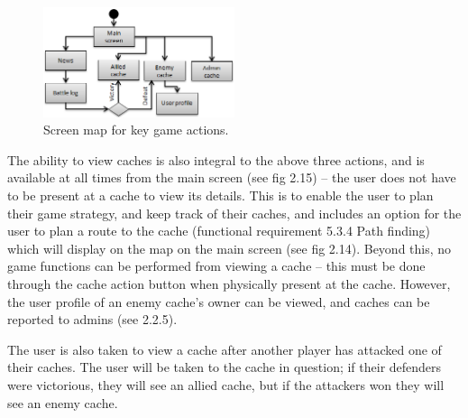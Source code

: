 \begin{figure}
	\vspace{-20pt}
	\begin{center}
	\includegraphics[width=0.5\textwidth]{images/viewing_caches}
	\caption{Screen map for key game actions.}
	\end{center}
	\vspace{-20pt}
\end{figure}
The ability to view caches is also integral to the above three actions, and is available at all times from the main screen (see fig 2.15) – the user does not have to be present at a cache to view its details. This is to enable the user to plan their game strategy, and keep track of their caches, and includes an option for the user to plan a route to the cache (functional requirement 5.3.4 Path finding) which will display on the map on the main screen (see fig 2.14). Beyond this, no game functions can be performed from viewing a cache – this must be done through the cache action button when physically present at the cache. However, the user profile of an enemy cache’s owner can be viewed, and caches can be reported to admins (see 2.2.5).

The user is also taken to view a cache after another player has attacked one of their caches. The user will be taken to the cache in question; if their defenders were victorious, they will see an allied cache, but if the attackers won they will see an enemy cache.

